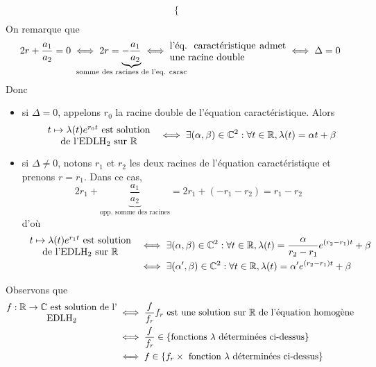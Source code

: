 \documentclass{article}
\renewenvironment{question_kholle}[2][ ]
{
	\subsection{\texorpdfstring{#2}{}}
	\notblank{#1}
	{
		\noindent #1
		\bigbreak
	}
	{}
	\begin{proof}
}
{
	\end{proof}
}
\begin{document}
\begin{question_kholle}
\begin{align*}
\begin{cases}
		                                                                         \end{cases} \\
	\end{align*}
	On remarque que
	\[
		2r+\frac{a_{1}}{a_{2}}=0 \iff 2r=\underbrace{-\frac{a_{1}}{a_{2}}}_{\mathclap{\text{somme des racines de l’eq. carac}}} \iff \parbox{12em}{l'éq. caractéristique admet une racine double} \iff \Delta=0
	\]
	Donc
	\begin{itemize}[label=$\star$]
		\item si $\Delta=0$, appelons $r_{0}$ la racine double de l'équation caractéristique. Alors
		      \[
			      \parbox{12em}{\centering$t\mapsto \lambda(t) e^{r_{0}t}$ est solution                                                                                                                                                                                            \\ de l’$\mathrm{EDLH_{2}}$ sur \R} \iff \exists(\alpha, \beta)\in\C^{2}: \forall t\in\R, \lambda(t)=\alpha t + \beta
		      \]
		\item si $\Delta\neq 0$, notons $r_{1}$ et $r_{2}$ les deux racines de l'équation caractéristique et prenons $r=r_{1}$. Dans ce cas,
		      \[
			      2r_{1}+\underbrace{\frac{a_{1}}{a_{2}}}_{\text{opp. somme des racines}} = 2r_{1} + (-r_{1}-r_{2}) = r_{1}-r_{2}
		      \]
		      d'où
		      \begin{align*}
			      \parbox{12em}{\centering$t\mapsto \lambda(t) e^{r_{1}t}$ est solution                                    \\ de l’$\mathrm{EDLH_{2}}$ sur \R} & \iff \exists(\alpha, \beta)\in\C^{2}: \forall t\in\R, \lambda(t)=\frac{\alpha}{r_{2}-r_{1}}e^{(r_{2}-r_{1})t}+\beta \\
			       & \iff \exists (\alpha ', \beta)\in\C^{2}: \forall t\in\R, \lambda(t)=\alpha ' e^{(r_{2}-r_{1})t}+\beta
		      \end{align*}
	\end{itemize}
	Observons que
	\begin{align*}
		\parbox{12em}{\centering $f:\R\rightarrow\C$ est solution de l' $\mathrm{EDLH_{2}}$} & \iff	\frac{f}{f_{r}}f_{r} \text{ est une solution sur \R de l'équation homogène}         \\
		                                                                                     & \iff \frac{f}{f_{r}} \in \left\{\text{fonctions $\lambda$ déterminées ci-dessus}\right\} \\
		                                                                                     & \iff f\in \left\{f_{r} \times \text{ fonction $\lambda$ déterminées ci-dessus}\right\}

\end{align*}
\end{question_kholle}
\end{document}
